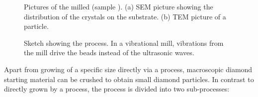	\begin{figure}[tp]
		\begin{subfigure}[t]{ 0.49\linewidth}
			\caption{}\label{subfig::sem_milled}
			\centering
		\end{subfigure}
		\hfill
		\begin{subfigure}[t]{ 0.49\linewidth}
			\caption{}\label{subfig::tem_milled}
			\centering
		\end{subfigure}
		\caption{Pictures of the milled \nds (sample \insituH). (a) SEM picture showing the distribution of the \nd crystals on the \ir substrate. (b) TEM picture of a \nd particle.}
		\label{fig::semtem_millled}
	\end{figure}

	\begin{figure}[tp]
		\centering
		\caption{Sketch showing the \basd process. In a vibrational mill, vibrations from the mill drive the beads instead of the ultrasonic waves.}
		\label{fig::sketch_basd}
	\end{figure}

	Apart from growing \nds of a specific size directly via a \CVD process, macroscopic diamond starting material can be crushed to obtain small diamond particles.
	In contrast to \nds directly grown by a \CVD process, the process is divided into two sub-processes:

